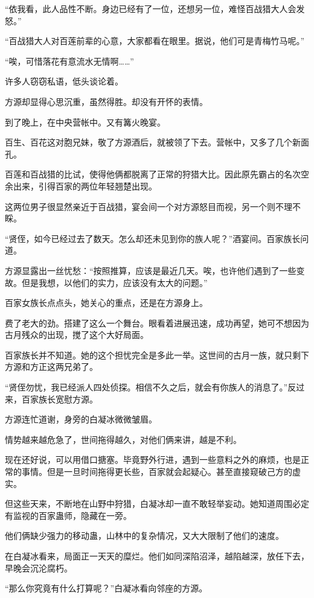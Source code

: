 \begin{this_body}
“依我看，此人品性不断。身边已经有了一位，还想另一位，难怪百战猎大人会发怒。”

“百战猎大人对百莲前辈的心意，大家都看在眼里。据说，他们可是青梅竹马呢。”

“唉，可惜落花有意流水无情啊……”

许多人窃窃私语，低头谈论着。

方源却显得心思沉重，虽然得胜。却没有开怀的表情。

到了晚上，在中央营帐中。又有篝火晚宴。

百生、百花这对胞兄妹，敬了方源酒后，就被领了下去。营帐中，又多了几个新面孔。

百莲和百战猎的比试，使得他俩都脱离了正常的狩猎大比。因此原先霸占的名次空余出来，引得百家的两位年轻翘楚出现。

这两位男子很显然亲近于百战猎，宴会间一个对方源怒目而视，另一个则不理不睬。

“贤侄，如今已经过去了数天。怎么却还未见到你的族人呢？”酒宴间。百家族长问道。

方源显露出一丝忧愁：“按照推算，应该是最近几天。唉，也许他们遇到了一些变故。但是我想，以他们的实力，应该没有太大的问题。”

百家女族长点点头，她关心的重点，还是在方源身上。

费了老大的劲。搭建了这么一个舞台。眼看着进展迅速，成功再望，她可不想因为古月残众的出现，搅了这个大好局面。

百家族长并不知道。她的这个担忧完全是多此一举。这世间的古月一族，就只剩下方源和方正这两兄弟了。

“贤侄勿忧，我已经派人四处侦探。相信不久之后，就会有你族人的消息了。”反过来，百家族长宽慰方源。

方源连忙道谢，身旁的白凝冰微微皱眉。

情势越来越危急了，世间拖得越久，对他们俩来讲，越是不利。

现在还好说，可以用借口搪塞。毕竟野外行进，遇到一些意料之外的麻烦，也是正常的事情。但是一旦时间拖得更长些，百家就会起疑心。甚至直接窥破己方的虚实。

但这些天来，不断地在山野中狩猎，白凝冰却一直不敢轻举妄动。她知道周围必定有监视的百家蛊师，隐藏在一旁。

他们俩缺少强力的移动蛊，山林中的复杂情况，又大大限制了他们的速度。

在白凝冰看来，局面正一天天的糜烂。他们如同深陷沼泽，越陷越深，放任下去，早晚会沉沦腐朽。

“那么你究竟有什么打算呢？”白凝冰看向邻座的方源。


\end{this_body}
